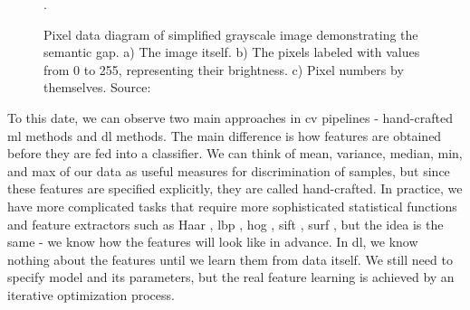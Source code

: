         \begin{figure}[h]
            \centering
            \qquad
            \qquad
            \caption{Pixel data diagram of simplified grayscale image demonstrating the semantic gap. a) The image itself. b) The pixels labeled with values from 0 to 255, representing their brightness. c) Pixel numbers by themselves. Source: \cite{computervisiongolan}}.
            \label{fig:lincon_pixels}
        \end{figure}
        
        To this date, we can observe two main approaches in \gls{cv} pipelines - hand-crafted \gls{ml} methods and \gls{dl} methods. The main difference is how features are obtained before they are fed into a classifier. We can think of mean, variance, median, min, and max of our data as useful measures for discrimination of samples, but since these features are specified explicitly, they are called hand-crafted. In practice, we have more complicated tasks that require more sophisticated statistical functions and feature extractors such as Haar \cite{viola2001rapid}, \gls{lbp} \cite{ojala2002multiresolution}, \gls{hog} \cite{dalal2005histograms}, \gls{sift} \cite{lowe2004method}, \gls{surf} \cite{bay2006surf}, but the idea is the same - we know how the features will look like in advance. In \gls{dl}, we know nothing about the features until we learn them from data itself. We still need to specify model and its parameters, but the real feature learning is achieved by an iterative optimization process.
        
